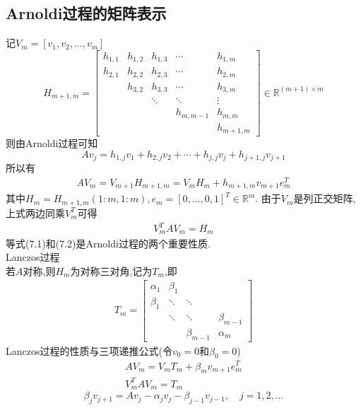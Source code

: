 \documentclass[12pt,a4paper]{article}
\begin{document}
\subsection*{Arnoldi过程的矩阵表示}
记$V_{m}=\left[v_{1}, v_{2}, \ldots, v_{m}\right]$
$$
H_{m+1, m}=\left[\begin{array}{ccccc}{h_{1,1}} & {h_{1,2}} & {h_{1,3}} & {\cdots} & {h_{1, m}} \\
 {h_{2,1}} & {h_{2,2}} & {h_{2,3}} & {\cdots} & {h_{2, m}} \\ 
 {} & {h_{3,2}} & {h_{3,3}} & {\cdots} & {h_{3, m}} \\
  {} & {}&{\ddots} & {\ddots} & {\vdots} \\
   {} & {} &{}& {h_{m, m-1}} & {h_{m, m}} \\
    {} & {} &{}&{}& {h_{m+1, m}}
    \end{array}\right] \in \mathbb{R}^{(m+1) \times m}
$$
则由Arnoldi过程可知
$$
A v_{j}=h_{1, j} v_{1}+h_{2, j} v_{2}+\cdots+h_{j, j} v_{j}+h_{j+1, j} v_{j+1}
$$
所以有
\begin{align*}
A V_{m}=V_{m+1} H_{m+1, m}=V_{m} H_{m}+h_{m+1, m} v_{m+1} e_{m}^{T}
\tag{7.1}
\end{align*}
其中$H_{m}=H_{m+1, m}(1 : m, 1 : m), e_{m}=[0, \ldots, 0,1]^{T} \in \mathbb{R}^{m}$.
由于$V_{m}$是列正交矩阵,上式两边同乘$V_{m}^{T}$可得
\begin{align*}
V_{m}^{T} A V_{m}=H_{m}
\tag{7.2}
\end{align*}
等式(7.1)和(7.2)是Arnoldi过程的两个重要性质.\\
Lanczos过程\\
若$A$对称,则$H_m$为对称三对角,记为$T_m$,即
\begin{align*}
T_{m}=
\left[\begin{array}{cccc}
{\alpha_{1}} & {\beta_{1}} & {} & {} \\ 
{\beta_{1}} & {\ddots} & {\ddots} & {} \\ 
{} & {\ddots} & {\ddots} & {\beta_{m-1}} \\ 
{} & {} & {\beta_{m-1}} & {\alpha_{m}}
\end{array}\right]
\tag{7.3}
\end{align*}
Lanczos过程的性质与{\color{blue}三项递推公式}(令$v_{0}=0$和$\beta_{0}=0$)
\begin{align*}
{A V_{m}=V_{m} T_{m}+\beta_{m} v_{m+1} e_{m}^{T}}\tag{7.4}\\ 
{V_{m}^{T} A V_{m}=T_{m}}\tag{7.5}
\end{align*}
$$
\beta_{j} v_{j+1}=A v_{j}-\alpha_{j} v_{j}-\beta_{j-1} v_{j-1}, \quad j=1,2, \ldots
$$
\end{document}
